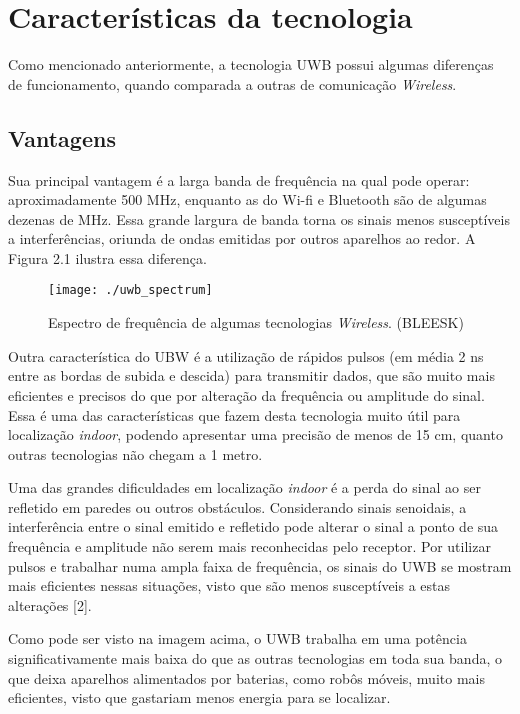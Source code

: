 \section{Características da tecnologia}
\label{sec:ass1}
Como mencionado anteriormente, a tecnologia UWB possui algumas diferenças de funcionamento,
quando comparada a outras de comunicação \textit{Wireless}. 

\subsection{Vantagens}
Sua principal vantagem é a larga banda de frequência na qual pode operar: aproximadamente 500 MHz, 
enquanto as do Wi-fi e Bluetooth são de algumas dezenas de MHz. Essa grande largura de banda torna 
os sinais menos susceptíveis a interferências, oriunda de ondas emitidas por outros aparelhos ao redor.
A Figura 2.1 ilustra essa diferença.

\begin{figure} [h!]												 
	\centering													 
	\texttt{[image: ./uwb\_spectrum]}				 
	\caption{Espectro de frequência de algumas tecnologias \textit{Wireless}. (BLEESK)}		
	\label{img:ihuma}												 
\end{figure}

Outra característica do UBW é a utilização de rápidos pulsos (em média 2 ns entre as bordas de subida e descida) para transmitir dados, 
que são muito mais eficientes e precisos do que por alteração da frequência ou amplitude do sinal. Essa é uma das características
que fazem desta tecnologia muito útil para localização \textit{indoor}, podendo apresentar uma precisão de menos de 15 cm,
quanto outras tecnologias não chegam a 1 metro.

Uma das grandes dificuldades em localização \textit{indoor} é a perda do sinal ao ser refletido em paredes ou outros obstáculos. Considerando sinais
senoidais, a interferência entre o sinal emitido e refletido pode alterar o sinal a ponto de sua frequência e amplitude não serem
mais reconhecidas pelo receptor. Por utilizar pulsos e trabalhar numa ampla faixa de frequência, os sinais do UWB se mostram mais 
eficientes nessas situações, visto que são menos susceptíveis a estas alterações [2].

Como pode ser visto na imagem acima, o UWB trabalha em uma potência significativamente mais baixa do que as outras tecnologias em 
toda sua banda, o que deixa aparelhos alimentados por baterias, como robôs móveis, muito mais eficientes, visto que gastariam menos energia
para se localizar.


